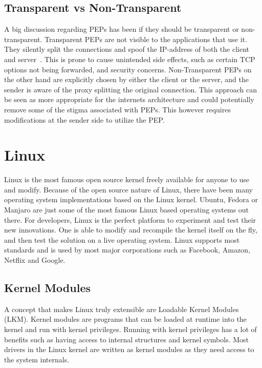 \documentclass[a4paper,english, 11pt]{report}
\begin{document}
\subsection{Transparent vs Non-Transparent}
A big discussion regarding PEPs has been if they should be transparent or non-transparent. Transparent PEPs are not visible to the applications that use it. They silently split the connections and spoof the IP-address of both the client and server~\cite{pep_dna}. This is prone to cause unintended side effects, such as certain TCP options not being forwarded, and security concerns. Non-Transparent PEPs on the other hand are explicitly chosen by either the client or the server, and the sender is aware of the proxy splitting the original connection. This approach can be seen as more appropriate for the internets architecture and could potentially remove some of the stigma associated with PEPs. This however requires modifications at the sender side to utilize the PEP.

\section{Linux}

Linux is the most famous open source kernel freely available for anyone to use and modify. Because of the open source nature of Linux, there have been many operating system implementations based on the Linux kernel. Ubuntu, Fedora or Manjaro are just some of the most famous Linux based operating systems out there. For developers, Linux is the perfect platform to experiment and test their new innovations. One is able to modify and recompile the kernel itself on the fly, and then test the solution on a live operating system. Linux supports most standards and is used by most major corporations such as Facebook, Amazon, Netflix and Google.

\subsection{Kernel Modules}
A concept that makes Linux truly extensible are Loadable Kernel Modules (LKM). Kernel modules are programs that can be loaded at runtime into the kernel and run with kernel privileges. Running with kernel privileges has a lot of benefits such as having access to internal structures and kernel symbols. Most drivers in the Linux kernel are written as kernel modules as they need access to the system internals.\\
\end{document}
